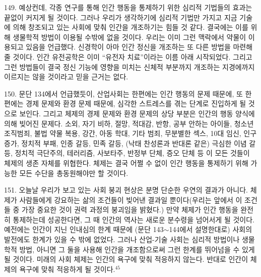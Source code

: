 \documentclass[11pt,a4paper]{article}
\begin{document}
\begin{multicols}{2}
149. 예상컨데, 각종 연구를 통해 인간 행동을 통제하기 위한 심리적 기법들의 효과는 끝없이 커지게 될  것이다. 그러나 우리가 생각하기에 심리적 기법만 가지고 지금 기술에 의해 창조되고 있는 사회에 맞춰 인간을 개조하기는 힘들 것 같다. 결국에는 이를 위해 생물학적 방법이 이용될 수밖에 없을 것이다.  우리는 이미 그런 맥락에서 약물이 이용되고 있음을 언급했다. 신경학이 아마 인간 정신을 개조하는 또  다른 방법을 마련해 줄 것이다. 인간 유전공학은 이미 “유전자 치료”이라는 이름 아래 시작되었다. 그리고  그런 방법들이 결국 정신 기능에 영향을 미치는 신체적 부분까지 개조하는 지경에까지 이르지는 않을  것이라고 믿을 근거는 없다. 


150. 문단 134에서 언급했듯이, 산업사회는 한편에는 인간 행동의 문제 때문에, 또 한편에는 경제  문제와 환경 문제 때문에, 심각한 스트레스를 겪는 단계로 진입하게 될 것으로 보인다. 그리고 체제의  경제 문제와 환경 문제의 상당 부분은 인간의 행동 양식에 의해 빚어진 문제다. 소외, 자기 비하, 절망,  적대감, 반항, 공부 안하는 아이들, 청소년 조직범죄, 불법 약물 복용, 강간, 아동 학대, 기타 범죄, 
무분별한 섹스, 10대 임신, 인구 증가, 정치적 부패, 인종 갈등, 민족 갈등, (낙태 찬성론과 반대론 같은) 극심한 이념 갈등, 정치적 극단주의, 테러리즘, 사보타주, 반정부 단체, 증오 단체 등 이 모든 것들이  체제의 생존 자체를 위협한다. 체제는 결국 어쩔 수 없이 인간 행동을 통제하기 위해 가능한 모든 수단을  총동원해야만 할 것이다.  


151. 오늘날 우리가 보고 있는 사회 붕괴 현상은 분명 단순한 우연의 결과가 아니다. 체제가 사람들에게  강요하는 삶의 조건들이 빚어낸 결과일 뿐이다(우리는 앞에서 이 조건들 중 가장 중요한 것이 권력 과정의 붕괴임을 밝혔다.) 만약 체제가 인간 행동을 완전히 통제하는데 성공한다면, 그 때 인간의 역사는 새로운  
분수령을 넘어서게 될 것이다. 예전에는 인간이 지닌 인내심의 한계 때문에 (문단 143${\sim}$144에서  설명한대로) 사회의 발전에도 한계가 있을 수 밖에 없었다. 그러나 산업-기술 사회는 심리적 방법이나  생물학적 방법, 아니면 그 둘을 사용해 인간을 개조함으로써 그런 한계를 뛰어넘을 수 있게 될 것이다.  미래의 사회 체제는 인간의 욕구에 맞춰 적응하지 않는다. 반대로 인간이 체제의 욕구에 맞춰 적응하게 될 것이다.\hyperlink{45}{$^{45}$} 



\end{multicols}
\end{document}
